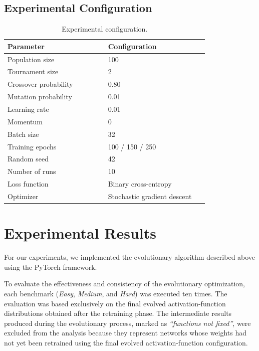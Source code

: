 \documentclass[12pt,fleqn,a4paper]{article}
\begin{document}
\subsection{Experimental Configuration}
\begin{table}[ht]
    \centering
    \caption{Experimental configuration.}
    \label{tab:experimental_setup}
    \renewcommand{\arraystretch}{1.2}
    \begin{tabular}{p{0.45\linewidth} p{0.45\linewidth}}
        \toprule
        \textbf{Parameter} & \textbf{Configuration} \\
        \midrule
        Population size      & 100 \\
        Tournament size      & 2 \\
        Crossover probability & 0.80 \\
        Mutation probability & 0.01 \\
        Learning rate        & 0.01 \\
        Momentum             & 0 \\
        Batch size           & 32 \\
        Training epochs      & 100 / 150 / 250 \\
        Random seed          & 42 \\
        Number of runs       & 10 \\
        Loss function        & Binary cross-entropy \\
        Optimizer            & Stochastic gradient descent \\
        \bottomrule
    \end{tabular}
\end{table}
\newpage
\section{Experimental Results}

For our experiments, we implemented the evolutionary algorithm described above using the PyTorch framework.\cite{Ansel_PyTorch_2_Faster_2024}

To evaluate the effectiveness and consistency of the evolutionary optimization, each benchmark (\textit{Easy}, \textit{Medium}, and \textit{Hard}) was executed ten times. The evaluation was based exclusively on the final evolved activation-function distributions obtained after the retraining phase. The intermediate results produced during the evolutionary process, marked as \textit{``functions not fixed''}, were excluded from the analysis because they represent networks whose weights had not yet been retrained using the final evolved activation-function configuration.
\end{document}
